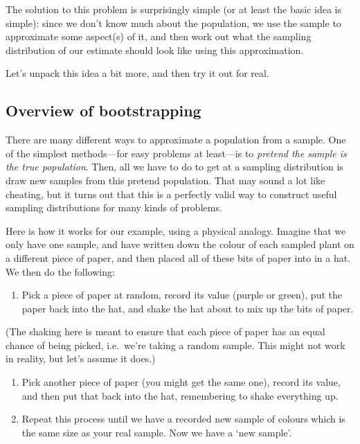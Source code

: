 \documentclass[]{book}
\providecommand{\tightlist}{%
  \setlength{\itemsep}{0pt}\setlength{\parskip}{0pt}}
\begin{document}
The solution to this problem is surprisingly simple (or at least the
basic idea is simple): since we don't know much about the population, we
use the sample to approximate some aspect(s) of it, and then work out
what the sampling distribution of our estimate should look like using
this approximation.

Let's unpack this idea a bit more, and then try it out for real.

\subsection{Overview of bootstrapping}\label{bootstrap-overview}

There are many different ways to approximate a population from a sample.
One of the simplest methods---for easy problems at least---is to
\emph{pretend the sample is the true population}. Then, all we have to
do to get at a sampling distribution is draw new samples from this
pretend population. That may sound a lot like cheating, but it turns out
that this is a perfectly valid way to construct useful sampling
distributions for many kinds of problems.

Here is how it works for our example, using a physical analogy. Imagine
that we only have one sample, and have written down the colour of each
sampled plant on a different piece of paper, and then placed all of
these bits of paper into in a hat. We then do the following:

\begin{enumerate}
\def\labelenumi{\arabic{enumi}.}
\tightlist
\item
  Pick a piece of paper at random, record its value (purple or green),
  put the paper back into the hat, and shake the hat about to mix up the
  bits of paper.
\end{enumerate}

(The shaking here is meant to ensure that each piece of paper has an
equal chance of being picked, i.e.~we're taking a random sample. This
might not work in reality, but let's assume it does.)

\begin{enumerate}
\def\labelenumi{\arabic{enumi}.}
\setcounter{enumi}{1}
\item
  Pick another piece of paper (you might get the same one), record its
  value, and then put that back into the hat, remembering to shake
  everything up.
\item
  Repeat this process until we have a recorded new sample of colours
  which is the same size as your real sample. Now we have a `new
  sample'.
\end{enumerate}
\end{document}
